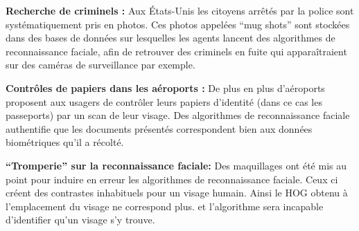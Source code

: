 \documentclass{beamer}
\begin{document}
\begin{columns}[c]
\begin{column}{.4\textwidth}
	 {\bf Recherche de criminels :} Aux États-Unis les citoyens arrêtés par la police sont systématiquement pris en photos. Ces photos appelées “mug shots” sont stockées dans des bases de données sur lesquelles les agents lancent des algorithmes de reconnaissance faciale, afin de retrouver des criminels en fuite qui apparaîtraient sur des caméras de surveillance par exemple. 

	 {\bf Contrôles de papiers dans les aéroports :} De plus en plus d’aéroports proposent aux usagers de contrôler leurs papiers d’identité (dans ce cas les passeports) par un scan de leur visage. Des algorithmes de reconnaissance faciale authentifie que les documents présentés correspondent bien aux données biométriques qu’il a récolté.\par
	\hrulefill
	
	{\bf “Tromperie” sur la reconnaissance faciale:} 
Des maquillages ont été mis au point pour induire en erreur les algorithmes de reconnaissance faciale. Ceux ci créent des contrastes inhabituels pour un visage humain. Ainsi le HOG obtenu à l’emplacement du visage ne correspond plus. et l’algorithme sera incapable d’identifier qu’un visage s’y trouve.\par
	\hrulefill
	\end{column}
\end{columns}
\end{document}
